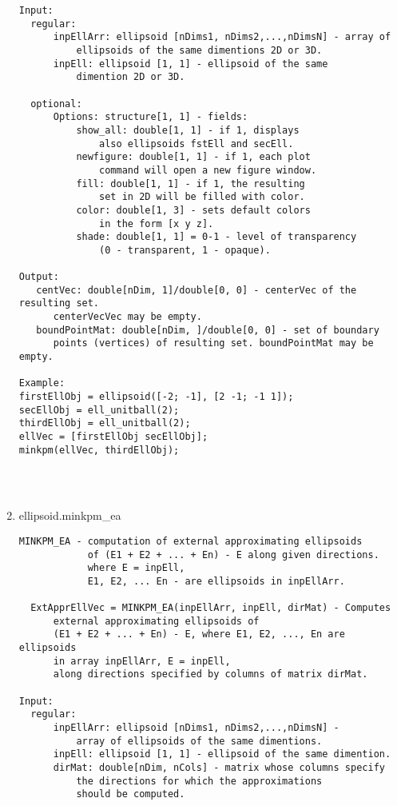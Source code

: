 \begin{enumerate}
\begin{lstlisting}
Input:
  regular:
      inpEllArr: ellipsoid [nDims1, nDims2,...,nDimsN] - array of
          ellipsoids of the same dimentions 2D or 3D.
      inpEll: ellipsoid [1, 1] - ellipsoid of the same
          dimention 2D or 3D.

  optional:
      Options: structure[1, 1] - fields:
          show_all: double[1, 1] - if 1, displays
              also ellipsoids fstEll and secEll.
          newfigure: double[1, 1] - if 1, each plot
              command will open a new figure window.
          fill: double[1, 1] - if 1, the resulting
              set in 2D will be filled with color.
          color: double[1, 3] - sets default colors
              in the form [x y z].
          shade: double[1, 1] = 0-1 - level of transparency
              (0 - transparent, 1 - opaque).

Output:
   centVec: double[nDim, 1]/double[0, 0] - centerVec of the resulting set.
      centerVecVec may be empty.
   boundPointMat: double[nDim, ]/double[0, 0] - set of boundary
      points (vertices) of resulting set. boundPointMat may be empty.

Example:
firstEllObj = ellipsoid([-2; -1], [2 -1; -1 1]);
secEllObj = ell_unitball(2);
thirdEllObj = ell_unitball(2);
ellVec = [firstEllObj secEllObj];
minkpm(ellVec, thirdEllObj);




\end{lstlisting}
\fontfamily{\familydefault}
\selectfont
\item {ellipsoid.minkpm\_ea}
\selectfont
\begin{lstlisting}
MINKPM_EA - computation of external approximating ellipsoids
            of (E1 + E2 + ... + En) - E along given directions.
            where E = inpEll,
            E1, E2, ... En - are ellipsoids in inpEllArr.

  ExtApprEllVec = MINKPM_EA(inpEllArr, inpEll, dirMat) - Computes
      external approximating ellipsoids of
      (E1 + E2 + ... + En) - E, where E1, E2, ..., En are ellipsoids
      in array inpEllArr, E = inpEll,
      along directions specified by columns of matrix dirMat.

Input:
  regular:
      inpEllArr: ellipsoid [nDims1, nDims2,...,nDimsN] -
          array of ellipsoids of the same dimentions.
      inpEll: ellipsoid [1, 1] - ellipsoid of the same dimention.
      dirMat: double[nDim, nCols] - matrix whose columns specify
          the directions for which the approximations
          should be computed.


\end{lstlisting}
\end{enumerate}
